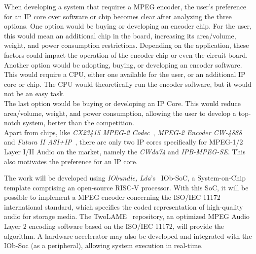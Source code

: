 When developing a system that requires a MPEG encoder, the user's preference for an IP core over software or chip becomes clear after analyzing the three options.
One option would be buying or developing an encoder chip. For the user, this would mean an additional chip in the board, increasing its area/volume, weight, and power consumption restrictions. Depending on the application, these factors could impact the operation of the encoder chip or even the circuit board.\\
Another option would be adopting, buying, or developing an encoder software. This would require a CPU, either one available for the user, or an additional IP core or chip. The CPU would theoretically run the encoder software, but it would not be an easy task.\\
The last option would be buying or developing an IP Core. This would reduce area/volume, weight, and power consumption, allowing the user to develop a top-notch system, better than the competition.\\
Apart from chips, like \textit{CX23415 MPEG-2 Codec}~\cite{cx23415}, \textit{MPEG-2 Encoder CW-4888}~\cite{cw4888} and \textit{Futura II ASI+IP}~\cite{futura}, there are only two IP cores specifically for MPEG-1/2 Layer I/II Audio on the market, namely the \textit{CWda74} and \textit{IPB-MPEG-SE}. This also motivates the preference for an IP core.

The work will be developed using \textit{IObundle, Lda}'s~\cite{iobundle} IOb-SoC, a System-on-Chip template comprising an open-source RISC-V processor. 
With this SoC, it will be possible to implement a MPEG encoder concerning the ISO/IEC 11172 international standard, which specifies the coded representation of high-quality audio for storage media. The TwoLAME~\cite{twolame} repository, an optimized MPEG Audio Layer 2 encoding software based on the ISO/IEC 11172, will provide the algorithm.
A hardware accelerator may also be developed and integrated with the IOb-Soc (as a peripheral), allowing system execution in real-time.

